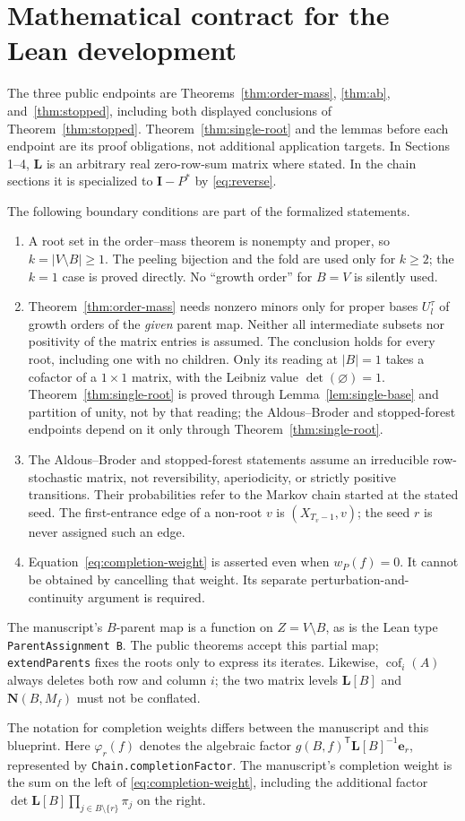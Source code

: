 \documentclass[11pt]{article}
\newcommand{\Id}{\mathbf I}
\newcommand{\Lmat}{\mathbf L}
\newcommand{\Nmat}{\mathbf N}
\newcommand{\cof}{\operatorname{cof}}
\begin{document}
\section{Mathematical contract for the Lean development}

The three public endpoints are Theorems~\ref{thm:order-mass},
\ref{thm:ab}, and~\ref{thm:stopped}, including both displayed
conclusions of Theorem~\ref{thm:stopped}. Theorem~\ref{thm:single-root}
and the lemmas before each endpoint are its proof obligations, not
additional application targets. In Sections 1--4, $\Lmat$ is an
arbitrary real zero-row-sum matrix where stated. In the chain
sections it is specialized to $\Id-P^*$ by \eqref{eq:reverse}.

The following boundary conditions are part of the formalized statements.
\begin{enumerate}
\item A root set in the order--mass theorem is nonempty and proper,
so $k=|V\setminus B|\geq1$. The peeling bijection and the fold are
used only for $k\geq2$; the $k=1$ case is proved directly. No
``growth order'' for $B=V$ is silently used.
\item Theorem~\ref{thm:order-mass} needs nonzero minors only for
proper bases $U_l^\tau$ of growth orders of the \emph{given}
parent map. Neither all intermediate subsets nor positivity of
the matrix entries is assumed. The conclusion holds for every
root, including one with no children. Only its reading at $|B|=1$
takes a cofactor of a $1\times1$ matrix, with the Leibniz value
$\det(\varnothing)=1$. Theorem~\ref{thm:single-root} is proved
through Lemma~\ref{lem:single-base} and partition of unity, not
by that reading; the Aldous--Broder and stopped-forest endpoints
depend on it only through Theorem~\ref{thm:single-root}.
\item The Aldous--Broder and stopped-forest statements assume an
irreducible row-stochastic matrix, not reversibility,
aperiodicity, or strictly positive transitions. Their probabilities
refer to the Markov chain started at the stated seed. The
first-entrance edge of a non-root $v$ is $(X_{T_v-1},v)$; the
seed $r$ is never assigned such an edge.
\item Equation~\eqref{eq:completion-weight} is asserted even when
$w_P(f)=0$. It cannot be obtained by cancelling that weight.
Its separate perturbation-and-continuity argument is required.
\end{enumerate}

The manuscript's $B$-parent map is a function on $Z=V\setminus B$,
as is the Lean type \texttt{ParentAssignment B}. The public theorems
accept this partial map; \texttt{extendParents} fixes the roots only
to express its iterates. Likewise, $\cof_i(A)$ always deletes both
row and column $i$; the two matrix levels $\Lmat[B]$ and
$\Nmat(B,M_f)$ must not be conflated.

The notation for completion weights differs between the manuscript
and this blueprint. Here $\varphi_r(f)$ denotes the algebraic factor
$g(B,f)^{\mathsf T}\Lmat[B]^{-1}\mathbf e_r$, represented by
\texttt{Chain.completionFactor}. The manuscript's completion weight
is the sum on the left of \eqref{eq:completion-weight}, including
the additional factor
$\det\Lmat[B]\prod_{j\in B\setminus\{r\}}\pi_j$ on the right.
\end{document}
